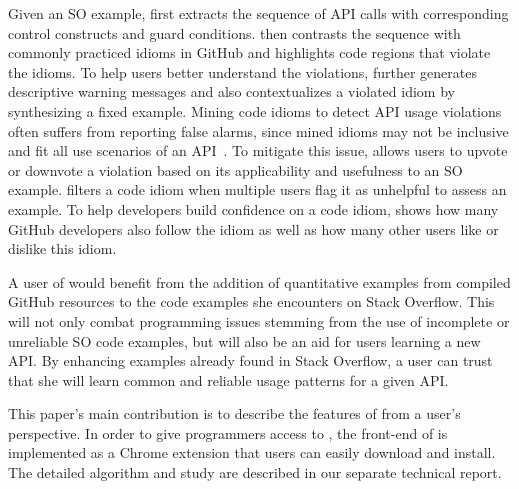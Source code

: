 Given an SO example, {\soa} first extracts the sequence of API calls with corresponding control constructs and guard conditions. {\soa} then contrasts the sequence with commonly practiced idioms in GitHub and highlights code regions that violate the idioms. To help users better understand the violations, {\soa} further generates descriptive warning messages and also contextualizes a violated idiom by synthesizing a fixed example. Mining code idioms to detect API usage violations often suffers from reporting false alarms, since mined idioms may not be inclusive and fit all use scenarios of an API~\cite{liang2016antminer}. To mitigate this issue, {\soa} allows users to upvote or downvote a violation based on its applicability and usefulness to an SO example. {\soa} filters a code idiom when multiple users flag it as unhelpful to assess an example. To help developers build confidence on a code idiom, {\soa} shows how many GitHub developers also follow the idiom as well as how many other users like or dislike this idiom.

A user of {\soa} would benefit from the addition of quantitative examples from compiled GitHub resources to the code examples she encounters on Stack Overflow. This will not only combat programming issues stemming from the use of incomplete or unreliable SO code examples, but will also be an aid for users learning a new API. By enhancing examples already found in Stack Overflow, a user can trust that she will learn common and reliable usage patterns for a given API.

This paper's main contribution is to describe the features of {\soa} from a user's perspective. In order to give programmers access to {\soa}, the front-end of {\soa} is implemented as a Chrome extension that users can easily download and install. The detailed algorithm and study are described in our separate technical report.

%
